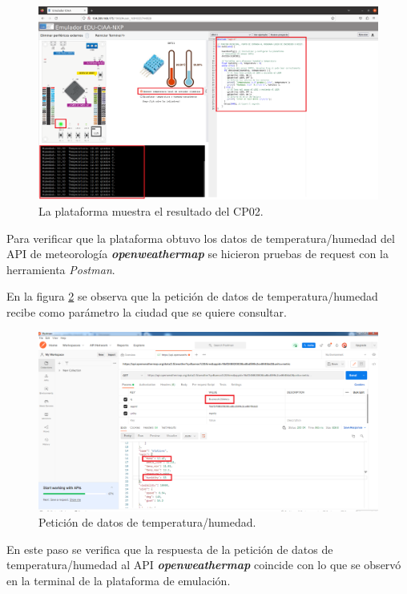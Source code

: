 \begin{figure}[ht]
	\centering
	\includegraphics[scale=.28]{./Figures/dht11Opcion1.png}
	\caption{La plataforma muestra el resultado del CP02.}
	\label{fig:RespuestaEmulador}
\end{figure}




Para verificar que la plataforma obtuvo los datos de temperatura/humedad del API de meteorología  \textit{\textbf{openweathermap}} se hicieron pruebas de request con la herramienta \textit{Postman}.

En la figura \ref{fig:RespuestaPostMan1} se observa que la petición de datos de temperatura/humedad recibe como parámetro la ciudad que se quiere consultar.

\hfill \break


\begin{figure}[ht]
	\centering
	\includegraphics[scale=.30]{./Figures/RespuestaPostMan1.png}
	\caption{Petición de datos de temperatura/humedad.}
	\label{fig:RespuestaPostMan1}
\end{figure}

En este paso se verifica que la respuesta de la petición de datos de temperatura/humedad al API \textit{\textbf{openweathermap}} coincide con lo que se observó en la terminal de la plataforma de emulación.


